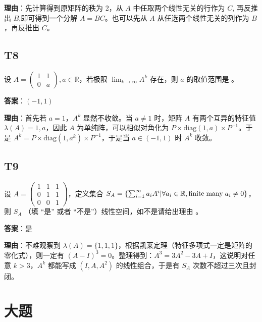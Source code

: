 \documentclass{article}
\begin{document}
\par \textbf{理由}：先计算得到原矩阵的秩为 2，从 $A$ 中任取两个线性无关的行作为 $C$, 再反推出 $B$,即可得到一个分解 $A=BC$。也可以先从 $A$ 从任选两个线性无关的列作为 $B$，再反推出 $C$。

\subsection{T8}

\par 设 $A=\begin{pmatrix}
	1 & 1\\
	0 & a
\end{pmatrix}, a\in \mathbb R$，若极限 $\lim_{k\to \infty}A^k$ 存在，则 $a$ 的取值范围是 \underline{\phantom{empty\_space}}。

\par \textbf{答案}：$(-1, 1)$

\par \textbf{理由}：首先若 $a=1$，$A^k$ 显然不收敛。当 $a\neq 1$ 时，矩阵 $A$ 有两个互异的特征值 $\lambda(A)={1, a}$，因此 $A$ 为单纯阵，可以相似对角化为 $P\times \text{diag}(1, a)\times P^{-1}$。于是 $A^k=P\times \text{diag}(1, a^k)\times P^{-1}$，于是当 $a\in(-1, 1)$ 时 $A^k$ 收敛。

\subsection{T9}

\par 设 $A=\begin{pmatrix}
	1 & 1 & 1\\
	0 & 1 & 1\\
	0 & 0 & 1
\end{pmatrix}$，定义集合 $S_A=\{\sum_{i=1}^\infty a_iA^i|\forall a_i\in \mathbb R, \text{finite\;many\;} a_i\neq 0\}$，则 $S_A$ \underline{\phantom{empty\_space}}（填 “是” 或者 “不是”）线性空间，如不是请给出理由 \underline{\phantom{empty\_space}} 。

\par \textbf{答案}：是

\par \textbf{理由}：不难观察到 $\lambda(A)=\{1, 1, 1\}$，根据凯莱定理（特征多项式一定是矩阵的零化式），则一定有 $(A-I)^3=0$。整理得到：$A^3=3A^2-3A+I$，这说明对任意 $k>3$，$A^k$ 都能写成 $(I, A, A^2)$ 的线性组合，于是有 $S_A$ 次数不超过三次且封闭。

\section{大题}
\end{document}
